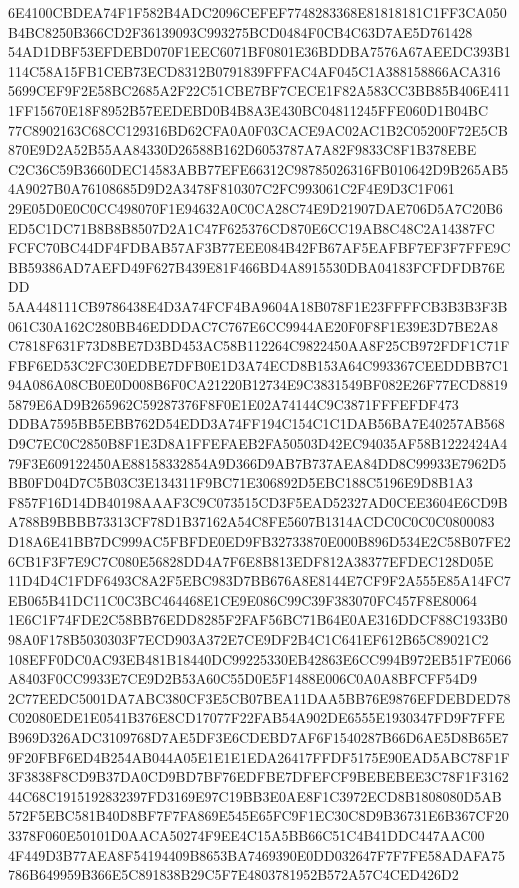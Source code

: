 \documentclass[UTF8,fontset=fandol,zihao=-4,a4paper]{ctexart}
\begin{document}
{{6E4100CBDEA74F1F582B4ADC2096CEFEF7748283368E81818181C1FF3CA050B4BC8250B366CD2F36139093C993275BCD0484F0CB4C63D7AE5D761428
54AD1DBF53EFDEBD070F1EEC6071BF0801E36BDDBA7576A67AEEDC393B1114C58A15FB1CEB73ECD8312B0791839FFFAC4AF045C1A388158866ACA316
5699CEF9F2E58BC2685A2F22C51CBE7BF7CECE1F82A583CC3BB85B406E4111FF15670E18F8952B57EEDEBD0B4B8A3E430BC04811245FFE060D1B04BC
77C8902163C68CC129316BD62CFA0A0F03CACE9AC02AC1B2C05200F72E5CB870E9D2A52B55AA84330D26588B162D6053787A7A82F9833C8F1B378EBE
C2C36C59B3660DEC14583ABB77EFE66312C98785026316FB010642D9B265AB54A9027B0A76108685D9D2A3478F810307C2FC993061C2F4E9D3C1F061
29E05D0E0C0CC498070F1E94632A0C0CA28C74E9D21907DAE706D5A7C20B6ED5C1DC71B8B8B8507D2A1C47F625376CD870E6CC19AB8C48C2A14387FC
FCFC70BC44DF4FDBAB57AF3B77EEE084B42FB67AF5EAFBF7EF3F7FFE9CBB59386AD7AEFD49F627B439E81F466BD4A8915530DBA04183FCFDFDB76EDD
5AA448111CB9786438E4D3A74FCF4BA9604A18B078F1E23FFFFCB3B3B3F3B061C30A162C280BB46EDDDAC7C767E6CC9944AE20F0F8F1E39E3D7BE2A8
C7818F631F73D8BE7D3BD453AC58B112264C9822450AA8F25CB972FDF1C71FFBF6ED53C2FC30EDBE7DFB0E1D3A74ECD8B153A64C993367CEEDDBB7C1
94A086A08CB0E0D008B6F0CA21220B12734E9C3831549BF082E26F77ECD88195879E6AD9B265962C59287376F8F0E1E02A74144C9C3871FFFEFDF473
DDBA7595BB5EBB762D54EDD3A74FF194C154C1C1DAB56BA7E40257AB568D9C7EC0C2850B8F1E3D8A1FFEFAEB2FA50503D42EC94035AF58B1222424A4
79F3E609122450AE88158332854A9D366D9AB7B737AEA84DD8C99933E7962D5BB0FD04D7C5B03C3E134311F9BC71E306892D5EBC188C5196E9D8B1A3
F857F16D14DB40198AAAF3C9C073515CD3F5EAD52327AD0CEE3604E6CD9BA788B9BBBB73313CF78D1B37162A54C8FE5607B1314ACDC0C0C0C0800083
D18A6E41BB7DC999AC5FBFDE0ED9FB32733870E000B896D534E2C58B07FE26CB1F3F7E9C7C080E56828DD4A7F6E8B813EDF812A38377EFDEC128D05E
11D4D4C1FDF6493C8A2F5EBC983D7BB676A8E8144E7CF9F2A555E85A14FC7EB065B41DC11C0C3BC464468E1CE9E086C99C39F383070FC457F8E80064
1E6C1F74FDE2C58BB76EDD8285F2FAF56BC71B64E0AE316DDCF88C1933B098A0F178B5030303F7ECD903A372E7CE9DF2B4C1C641EF612B65C89021C2
108EFF0DC0AC93EB481B18440DC99225330EB42863E6CC994B972EB51F7E066A8403F0CC9933E7CE9D2B53A60C55D0E5F1488E006C0A0A8BFCFF54D9
2C77EEDC5001DA7ABC380CF3E5CB07BEA11DAA5BB76E9876EFDEBDED78C02080EDE1E0541B376E8CD17077F22FAB54A902DE6555E1930347FD9F7FFE
B969D326ADC3109768D7AE5DF3E6CDEBD7AF6F1540287B66D6AE5D8B65E79F20FBF6ED4B254AB044A05E1E1E1EDA26417FFDF5175E90EAD5ABC78F1F
3F3838F8CD9B37DA0CD9BD7BF76EDFBE7DFEFCF9BEBEBEE3C78F1F316244C68C1915192832397FD3169E97C19BB3E0AE8F1C3972ECD8B1808080D5AB
572F5EBC581B40D8BF7F7FA869E545E65FC9F1EC30C8D9B36731E6B367CF203378F060E50101D0AACA50274F9EE4C15A5BB66C51C4B41DDC447AAC00
4F449D3B77AEA8F54194409B8653BA7469390E0DD032647F7F7FE58ADAFA75786B649959B366E5C891838B29C5F7E4803781952B572A57C4CED426D2
}}
\end{document}
